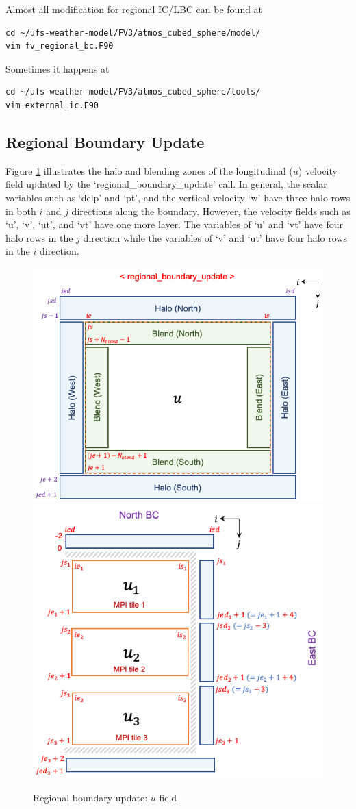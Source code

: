 \documentclass[11pt,fleqn]{report}              %
\begin{document}
Almost all modification for regional IC/LBC can be found at
\lstset{language=bash}   
\begin{lstlisting}[frame=trBL]
cd ~/ufs-weather-model/FV3/atmos_cubed_sphere/model/
vim fv_regional_bc.F90
\end{lstlisting}

Sometimes it happens at
\lstset{language=bash}   
\begin{lstlisting}[frame=trBL]
cd ~/ufs-weather-model/FV3/atmos_cubed_sphere/tools/
vim external_ic.F90
\end{lstlisting}



\subsection{Regional Boundary Update}

Figure \ref{fig:regional_bc_update_u} illustrates the halo and blending zones of the longitudinal ($u$) velocity field updated by the `regional\_boundary\_update' call. In general, the scalar variables such as `delp' and `pt', and the vertical velocity `w' have three halo rows in both $i$ and $j$ directions along the boundary. However, the velocity fields such as `u', `v', `ut', and `vt' have one more layer. The variables of `u' and `vt' have four halo rows in the $j$ direction while the variables of `v' and `ut' have four halo rows in the $i$ direction. 

\begin{figure}[ht!]
  \centering
  \includegraphics[width=0.5\linewidth]{regional_bc_update.png}
  \includegraphics[width=0.43\linewidth]{regional_bc_tiles.png}
  \caption{Regional boundary update: $u$ field}
  \label{fig:regional_bc_update_u}
\end{figure}
\end{document}
